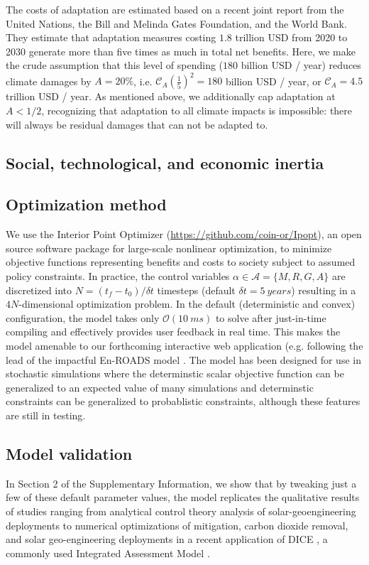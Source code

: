 \documentclass[9pt,twocolumn,twoside,lineno]{pnas-new}
\begin{document}
{The costs of adaptation are estimated based on a recent joint report from the United Nations, the Bill and Melinda Gates Foundation, and the World Bank. They estimate that adaptation measures costing $1.8$ trillion USD from 2020 to 2030 generate more than five times as much in total net benefits. Here, we make the crude assumption that this level of spending ($180$ billion USD / year) reduces climate damages by $A=20\%$, i.e. $\mathcal{C}_{A} \left( \frac{1}{5} \right)^{2} = 180$ billion USD / year, or $\mathcal{C}_{A} = 4.5$ trillion USD / year. As mentioned above, we additionally cap adaptation at $A<1/2$, recognizing that adaptation to all climate impacts is impossible: there will always be residual damages that can not be adapted to.

\subsection*{Social, technological, and economic inertia}


\subsection*{Optimization method}
We use the Interior Point Optimizer \cite{wachter_implementation_2006} (\url{https://github.com/coin-or/Ipopt}), an open source software package for large-scale nonlinear optimization, to minimize objective functions representing benefits and costs to society subject to assumed policy constraints. In practice, the control variables $\alpha \in \mathcal{A} = \{ M, R, G, A\}$ are discretized into $N = (t_{f} - t_{0}) / \delta t$ timesteps (default $\delta t = \SI{5}{years}$) resulting in a $4N$-dimensional optimization problem. In the default (deterministic and convex) configuration, the model takes only $\mathcal{O}(\SI{10}{ms})$ to solve after just-in-time compiling and effectively provides user feedback in real time.  This makes the model amenable to our forthcoming interactive web application (e.g. following the lead of the impactful En-ROADS model \cite{siegel2018roads}. The model has been designed for use in stochastic simulations where the determinstic scalar objective function can be generalized to an expected value of many simulations and determinstic constraints can be generalized to probablistic constraints, although these features are still in testing.

\subsection*{Model validation} In Section 2 of the Supplementary Information, we show that by tweaking just a few of these default parameter values, the model replicates the qualitative results of studies ranging from analytical control theory analysis of solar-geoengineering deployments \cite{soldatenko_optimal_2018} to numerical optimizations of mitigation, carbon dioxide removal, and solar geo-engineering deployments in a recent application of DICE \cite{belaia_optimal_2019}, a commonly used Integrated Assessment Model \cite{nordhaus_optimal_1992}.
}

\showmatmethods{} %

\acknow{}

\showacknow{} %


\end{document}
